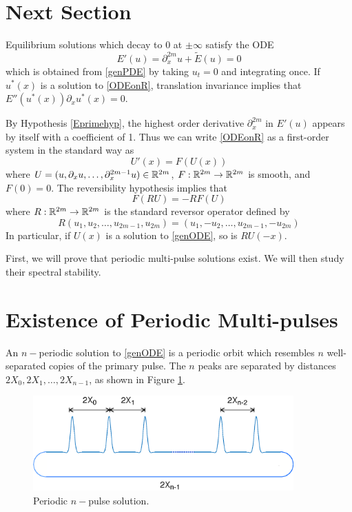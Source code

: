 \documentclass[thesis.tex]{subfiles}
\begin{document}
\section{Next Section}

Equilibrium solutions which decay to 0 at $\pm \infty$ satisfy the ODE 
\begin{equation}\label{ODEonR}
E'(u) = \partial_x^{2m}u + \tilde{E}(u) = 0
\end{equation}
which is obtained from \eqref{genPDE} by taking $u_t = 0$ and integrating once. If $u^*(x)$ is a solution to \eqref{ODEonR}, translation invariance implies that $E''(u^*(x))\partial_x u^*(x) = 0$.

By Hypothesis \ref{Eprimehyp}, the highest order derivative $\partial_x^{2m}$ in $E'(u)$ appears by itself with a coefficient of 1. Thus we can write \eqref{ODEonR} as a first-order system in the standard way as
\begin{equation}\label{genODE}
U'(x) = F(U(x))
\end{equation}
where $U = (u, \partial_x u, \dots, \partial_x^{2m-1} u) \in {\mathbb R}^{2m}$, $F: {\mathbb R}^{2m} \rightarrow {\mathbb R}^{2m}$ is smooth, and $F(0) = 0$. The reversibility hypothesis implies that
\begin{equation}\label{genODErev}
F(RU) = -RF(U)
\end{equation}
where $R:{\mathbb R}^{2m} \rightarrow {\mathbb R}^{2m}$ is the standard reversor operator defined by
\begin{equation}\label{reverserR2m}
R(u_1, u_2, \dots, u_{2m-1}, u_{2m}) = (u_1, -u_2, \dots, u_{2m-1}, -u_{2m})
\end{equation}
In particular, if $U(x)$ is a solution to \eqref{genODE}, so is $RU(-x)$.

First, we will prove that periodic multi-pulse solutions exist. We will then study their spectral stability.

\section{Existence of Periodic Multi-pulses}

An $n-$periodic solution to \eqref{genODE} is a periodic orbit which resembles $n$ well-separated copies of the primary pulse. The $n$ peaks are separated by distances $2X_0, 2X_1, \dots, 2X_{n-1}$, as shown in Figure \ref{fig:permultipulse}.

\begin{figure}[H]
\label{fig:permultipulse}
\includegraphics[width=10cm]{periodic/multipulseperiodic}
\caption{Periodic $n-$pulse solution.}
\end{figure} 
\end{document}
